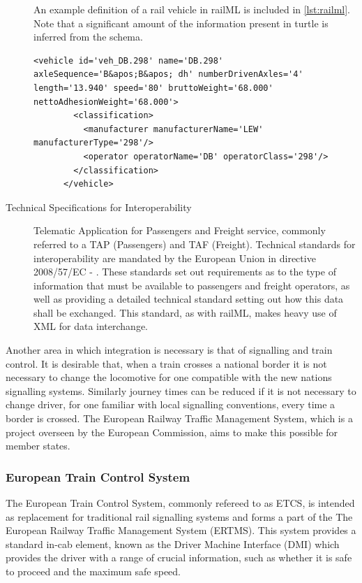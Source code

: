 \begin{description}
    An example definition of a rail vehicle in railML is included in \autoref{lst:railml}. Note that a significant amount of the information present in turtle is inferred from the schema.
    \begin{lstlisting}[label={lst:railml},caption={A German rail locomotive, as defined in railML},frame=tb]
      <vehicle id='veh_DB.298' name='DB.298' axleSequence='B&apos;B&apos; dh' numberDrivenAxles='4' length='13.940' speed='80' bruttoWeight='68.000' nettoAdhesionWeight='68.000'>
        <classification>
          <manufacturer manufacturerName='LEW' manufacturerType='298'/>
          <operator operatorName='DB' operatorClass='298'/>
        </classification>
      </vehicle>
    \end{lstlisting}
    \item[Technical Specifications for Interoperability] Telematic Application for Passengers and Freight service, commonly referred to a TAP (Passengers) and TAF (Freight). Technical standards for interoperability are mandated by the European Union in directive 2008/57/EC - \citet{CounciloftheEuropeanUnionq2008}. These standards set out requirements as to the type of information that must be available to passengers and freight operators, as well as providing a detailed technical standard setting out how this data shall be exchanged. This standard, as with railML, makes heavy use of XML for data interchange.  
\end{description}

Another area in which integration is necessary is that of signalling and train control. It is desirable that, when a train crosses a national border it is not necessary to change the locomotive for one compatible with the new nations signalling systems. Similarly journey times can be reduced if it is not necessary to change driver, for one familiar with local signalling conventions, every time a border is crossed. The European Railway Traffic Management System, which is a project overseen by the European Commission, aims to make this possible for member states.

\subsubsection{European Train Control System}
\label{sec:etcs}
The European Train Control System, commonly refereed to as ETCS, is intended as replacement for traditional rail signalling systems and forms a part of the The European Railway Traffic Management System (ERTMS). This system provides a standard in-cab element, known as the Driver Machine Interface (DMI) which provides the driver with a range of crucial information, such as whether it is safe to proceed and the maximum safe speed. 

